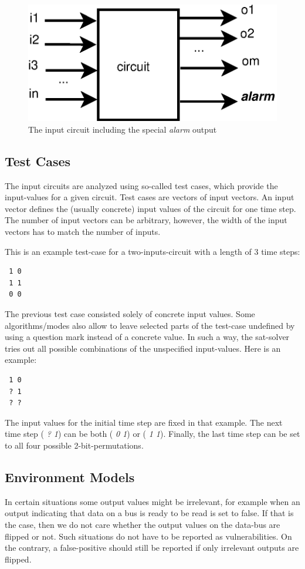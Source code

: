 \documentclass[a4paper,10pt]{article}
\begin{document}
\begin{figure}[!htb]
\centering
\includegraphics[scale = 0.48]{img/circuit-in.eps}
\centering \caption{The input circuit including the special \emph{alarm} output} 
\label{circuit-in}
\end{figure}

\subsection{Test Cases}
The input circuits are analyzed using so-called test cases, which provide the input-values for a given circuit.
Test cases are vectors of input vectors. An input vector defines the (usually concrete) input values of the circuit for one time step.
The number of input vectors can be arbitrary, however, the width of the input vectors has to match the number of inputs.

This is an example test-case for a two-inputs-circuit with a length of 3 time steps:
\begin{verbatim}
 1 0
 1 1
 0 0
\end{verbatim}


The previous test case consisted solely of concrete input values. Some algorithms/modes also allow to leave selected parts of the test-case undefined by using
a question mark instead of a concrete value.
In such a way, the sat-solver tries out all possible combinations of the unspecified input-values. Here is an example:
\begin{verbatim}
 1 0
 ? 1
 ? ?
\end{verbatim}

The input values for the initial time step are fixed in that example. The next time step  (\emph{ ? 1}) can be both (\emph{ 0 1}) or (\emph{ 1 1}). Finally, the last time step
can be set to all four possible 2-bit-permutations.


\subsection{Environment Models}  \label{environment}
In certain situations some output values might be irrelevant, for example when an output indicating that data on a bus is ready to be read is set to false.
If that is the case, then we do not care whether the output values on the data-bus are flipped or not. Such situations do not have to be reported as
vulnerabilities. On the contrary, a false-positive should still be reported if only irrelevant outputs are flipped.
\end{document}
